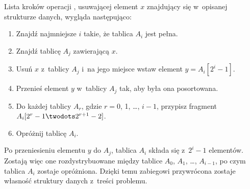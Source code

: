 \subproblem %
Lista kroków operacji , usuwającej element $x$ znajdujący się w~opisanej strukturze danych, wygląda następująco:
\begin{enumerate}
\item Znajdź najmniejsze $i$ takie, że tablica $A_i$ jest pełna.
\item Znajdź tablicę $A_j$ zawierającą $x$.
\item Usuń $x$ z~tablicy $A_j$ i~na jego miejsce wstaw element $y=A_i[2^i-1]$.
\item Przenieś element $y$ w~tablicy $A_j$ tak, aby była ona posortowana.
\item Do każdej tablicy $A_r$, gdzie $r=0$, 1, \dots, ${i-1}$, przypisz fragment $A_i[2^r-1\twodots2^{r+1}-2]$.
\item Opróżnij tablicę $A_i$.
\end{enumerate}
Po przeniesieniu elementu $y$ do $A_j$, tablica $A_i$ składa się z~$2^i-1$ elementów.
Zostają więc one rozdystrybuowane między tablice $A_0$, $A_1$, \dots, $A_{i-1}$, po czym tablica $A_i$ zostaje opróżniona.
Dzięki temu zabiegowi przywrócona zostaje własność struktury danych z~treści problemu.
